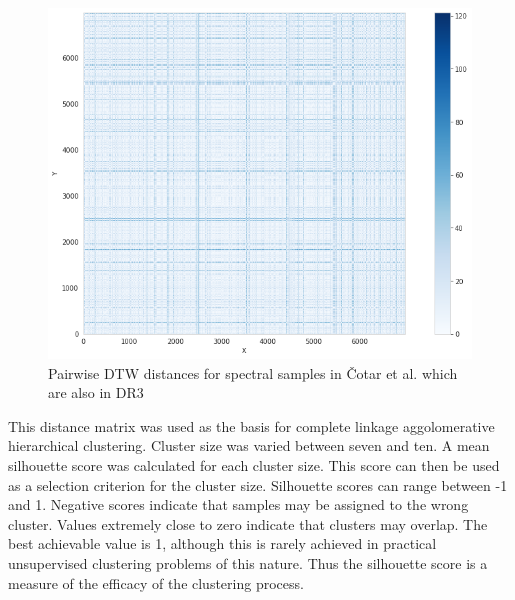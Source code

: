 \begin{figure}[h]
\centering
\includegraphics[scale=0.60]{figures/dtw cotar.png}
\caption{Pairwise DTW distances for spectral samples in Čotar et al. which are also in DR3}
\end{figure}

This distance matrix was used as the basis for complete linkage aggolomerative hierarchical clustering. Cluster size was varied between seven and ten. A mean silhouette score was calculated for each cluster size. This score can then be used as a selection criterion for the cluster size. Silhouette scores can range between -1 and 1. Negative scores indicate that samples may be assigned to the wrong cluster. Values extremely close to zero indicate that clusters may overlap. The best achievable value is 1, although this is rarely achieved in practical unsupervised clustering problems of this nature. Thus the silhouette score is a measure of the efficacy of the clustering process.

